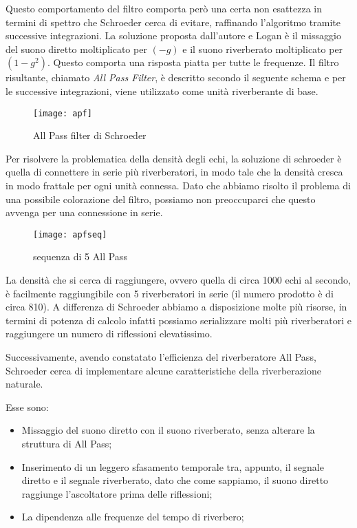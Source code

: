Questo comportamento del filtro comporta però una certa non esattezza in termini di spettro che Schroeder cerca di evitare, raffinando l’algoritmo tramite successive integrazioni.
La soluzione proposta dall’autore e Logan è il missaggio del suono diretto moltiplicato per $(-g)$ e il suono riverberato moltiplicato per $(1-g^2)$. Questo comporta una risposta piatta per tutte le frequenze. Il filtro risultante, chiamato \emph{All Pass Filter}, è descritto secondo il seguente schema e per le successive integrazioni, viene utilizzato come unità riverberante di base.

\begin{figure}[htp]
\centering
\texttt{[image: apf]}
\caption{All Pass filter di Schroeder}
\label{fig:apf}
\end{figure}

Per risolvere la problematica della densità degli echi, la soluzione di schroeder è quella di connettere in serie più riverberatori, in modo tale che la densità cresca in modo frattale per ogni unità connessa. Dato che abbiamo risolto il problema di una possibile colorazione del filtro, possiamo non preoccuparci che questo avvenga per una connessione in serie.

\begin{figure}[htp]
\centering
\texttt{[image: apfseq]}
\caption{sequenza di 5 All Pass}
\label{fig:apfseq}
\end{figure}

La densità che si cerca di raggiungere, ovvero quella di circa 1000 echi al secondo, è facilmente raggiungibile con 5 riverberatori in serie (il numero prodotto è di circa 810). A differenza di Schroeder abbiamo a disposizione molte più risorse, in termini di potenza di calcolo infatti possiamo serializzare molti più riverberatori e raggiungere un numero di riflessioni elevatissimo.

Successivamente, avendo constatato l’efficienza del riverberatore All Pass, Schroeder cerca di implementare alcune caratteristiche della riverberazione naturale.

Esse sono:

\begin{itemize}
\item Missaggio del suono diretto con il suono riverberato, senza alterare la struttura di All Pass;
\item Inserimento di un leggero sfasamento temporale tra, appunto, il segnale diretto e il segnale riverberato, dato che come sappiamo, il suono diretto raggiunge l’ascoltatore prima delle riflessioni;
\item La dipendenza alle frequenze del tempo di riverbero;
\end{itemize}


